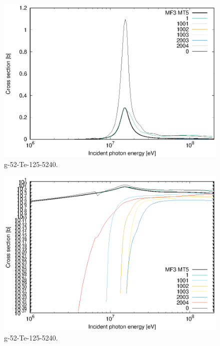 \begin{figure}
 \includegraphics[width=\linewidth]{eps/g_52-Te-125_5240.eps}
  \caption{g-52-Te-125-5240.}
\end{figure}
\begin{figure}
 \includegraphics[width=\linewidth]{eps-log/g_52-Te-125_5240.eps}
 \caption{g-52-Te-125-5240.}
\end{figure}
\newpage \clearpage

